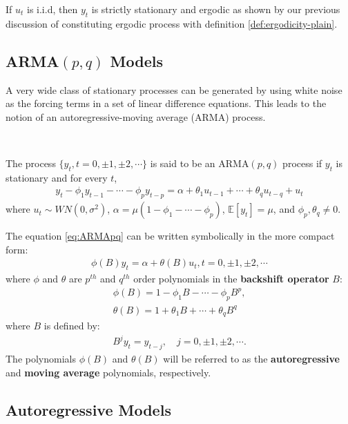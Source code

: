 If $u_t$ is i.i.d, then $y_t$ is strictly stationary and ergodic as shown by our previous discussion of constituting ergodic process with definition \ref{def:ergodicity-plain}.

\subsection{ARMA$(p,q)$ Models}\label{sec:ARMApq}

A very wide class of stationary processes can be generated by using white
noise as the forcing terms in a set of linear difference equations. This leads to
the notion of an autoregressive-moving average (ARMA) process.

\begin{definition}\label{def:ARMApq}
    \
    
    The process $\{ y_t, t=0, \pm1, \pm2, \cdots\}$ is said to be an ARMA$(p,q)$ process if $y_t$ is stationary and for every $t$,
    \begin{gather}\label{eq:ARMApq}
        y_t - \phi_1 y_{t-1} - \cdots - \phi_p y_{t-p} = \alpha + \theta_1 u_{t-1} + \cdots + \theta_q u_{t-q} + u_t
    \end{gather}
    where $u_t \sim WN(0,\sigma^2)$, $\alpha = \mu \left( 1-\phi_1 - \cdots - \phi_p \right)$, $\mathbb{E}[y_t] = \mu$, and $\phi_p, \theta_q \neq 0.$
\end{definition}
The equation \ref{eq:ARMApq} can be written symbolically in the more compact form:
\begin{gather*}
    \phi (B) y_t = \alpha + \theta(B) u_t, t = 0, \pm1, \pm2, \cdots
\end{gather*}
where $\phi $ and $\theta$ are $p^{th}$ and $q^{th}$ order polynomials in the \textbf{backshift operator} $B$:
\begin{gather*}
    \phi (B) = 1 - \phi_1 B - \cdots - \phi_p B^p,\\
    \theta (B) = 1 + \theta_1 B + \cdots + \theta_q B^q
\end{gather*}
where $B$ is defined by:
\begin{gather*}
    B^j y_t = y_{t-j}, \quad j = 0, \pm1, \pm2, \cdots.
\end{gather*}
The polynomials $\phi(B)$ and $\theta(B)$ will be referred to as the \textbf{autoregressive} and \textbf{moving average} polynomials, respectively.

\subsection{Autoregressive Models}\label{sec:AR}

